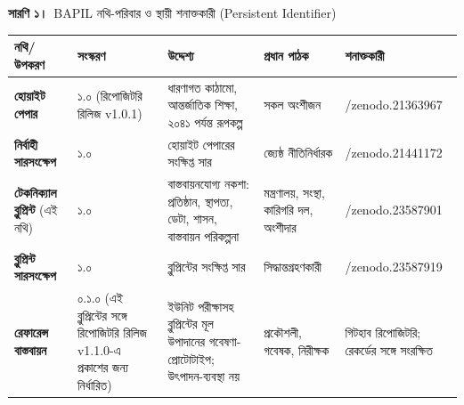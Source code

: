 \documentclass[border=10pt]{standalone}
\begin{document}
\begin{minipage}{17cm}
{\large\bfseries সারণি ১।}\ {\large BAPIL নথি-পরিবার ও স্থায়ী শনাক্তকারী (Persistent Identifier)}\par\vspace{7pt}
\small
{}
\begin{tabularx}{\linewidth}{@{}>{\hsize=0.815\hsize\raggedright\arraybackslash}X>{\hsize=0.598\hsize\raggedright\arraybackslash}X>{\hsize=1.413\hsize\raggedright\arraybackslash}X>{\hsize=1.033\hsize\raggedright\arraybackslash}X>{\hsize=1.141\hsize\raggedright\arraybackslash}X@{}}
\arrayrulecolor{bapilrule}\toprule
\rowcolor{white}\textbf{নথি/\allowbreak{}উপকরণ} & \textbf{সংস্করণ} & \textbf{উদ্দেশ্য} & \textbf{প্রধান পাঠক} & \textbf{শনাক্তকারী} \\
\midrule
\textbf{হোয়াইট পেপার} & ১.০ (রিপোজিটরি রিলিজ v1.0.1) & ধারণাগত কাঠামো, আন্তর্জাতিক শিক্ষা, ২০৪১ পর্যন্ত রূপকল্প & সকল অংশীজন & 10.5281/\allowbreak{}zenodo.21363967 \\
\textbf{নির্বাহী সারসংক্ষেপ} & ১.০ & হোয়াইট পেপারের সংক্ষিপ্ত সার & জ্যেষ্ঠ নীতিনির্ধারক & 10.5281/\allowbreak{}zenodo.21441172 \\
\textbf{টেকনিক্যাল ব্লুপ্রিন্ট} (এই নথি) & ১.০ & বাস্তবায়নযোগ্য নকশা: প্রতিষ্ঠান, স্থাপত্য, ডেটা, শাসন, বাস্তবায়ন পরিকল্পনা & মন্ত্রণালয়, সংস্থা, কারিগরি দল, অংশীদার & 10.5281/\allowbreak{}zenodo.23587901 \\
\textbf{ব্লুপ্রিন্ট সারসংক্ষেপ} & ১.০ & ব্লুপ্রিন্টের সংক্ষিপ্ত সার & সিদ্ধান্তগ্রহণকারী & 10.5281/\allowbreak{}zenodo.23587919 \\
\textbf{রেফারেন্স বাস্তবায়ন} & ০.১.০ (এই ব্লুপ্রিন্টের সঙ্গে রিপোজিটরি রিলিজ v1.1.0-এ প্রকাশের জন্য নির্ধারিত) & ইউনিট পরীক্ষাসহ ব্লুপ্রিন্টের মূল উপাদানের গবেষণা-প্রোটোটাইপ; উৎপাদন-ব্যবস্থা নয় & প্রকৌশলী, গবেষক, নিরীক্ষক & গিটহাব রিপোজিটরি; রেকর্ডের সঙ্গে সংরক্ষিত \\
\bottomrule
\end{tabularx}
\par{}
\end{minipage}
\end{document}
